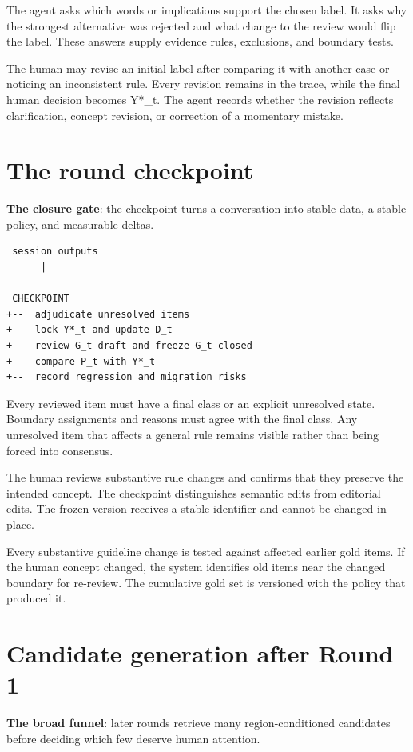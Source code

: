 The agent asks which words or implications support the chosen label. It asks why the strongest alternative was rejected and what change to the review would flip the label. These answers supply evidence rules, exclusions, and boundary tests.

The human may revise an initial label after comparing it with another case or noticing an inconsistent rule. Every revision remains in the trace, while the final human decision becomes Y*_t. The agent records whether the revision reflects clarification, concept revision, or correction of a momentary mistake.


\section{The round checkpoint}
\textbf{The closure gate}: the checkpoint turns a conversation into stable data, a stable policy, and measurable deltas.

\begin{verbatim}
 session outputs
      |

 CHECKPOINT
+--  adjudicate unresolved items
+--  lock Y*_t and update D_t
+--  review G_t draft and freeze G_t closed
+--  compare P_t with Y*_t
+--  record regression and migration risks
\end{verbatim}
Every reviewed item must have a final class or an explicit unresolved state. Boundary assignments and reasons must agree with the final class. Any unresolved item that affects a general rule remains visible rather than being forced into consensus.

The human reviews substantive rule changes and confirms that they preserve the intended concept. The checkpoint distinguishes semantic edits from editorial edits. The frozen version receives a stable identifier and cannot be changed in place.

Every substantive guideline change is tested against affected earlier gold items. If the human concept changed, the system identifies old items near the changed boundary for re-review. The cumulative gold set is versioned with the policy that produced it.


\section{Candidate generation after Round 1}
\textbf{The broad funnel}: later rounds retrieve many region-conditioned candidates before deciding which few deserve human attention.

